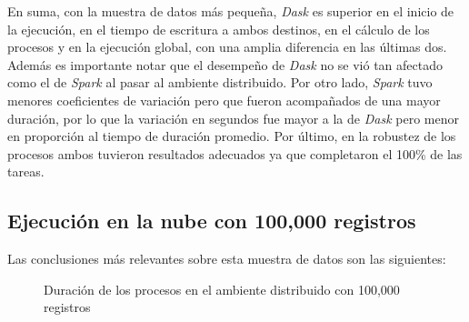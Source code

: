 En suma, con la muestra de datos más pequeña, \textit{Dask} es superior en el inicio de la ejecución, en el tiempo de escritura a ambos destinos, en el cálculo de los procesos y en la ejecución global, con una amplia diferencia en las últimas dos. Además es importante notar que el desempeño de \textit{Dask} no se vió tan afectado como el de \textit{Spark} al pasar al ambiente distribuido. Por otro lado, \textit{Spark} tuvo menores coeficientes de variación pero que fueron acompañados de una mayor duración, por lo que la variación en segundos fue mayor a la de \textit{Dask} pero menor en proporción al tiempo de duración promedio. Por último, en la robustez de los procesos ambos tuvieron resultados adecuados ya que completaron el 100\% de las tareas.

\subsection{Ejecución en la nube con 100,000 registros}

Las conclusiones más relevantes sobre esta muestra de datos son las siguientes:

\begin{center}
\begin{figure}
\caption{Duración de los procesos en el ambiente distribuido con 100,000 registros}
\label{barras:nube-duracion100K}
\end{figure}
\end{center}


